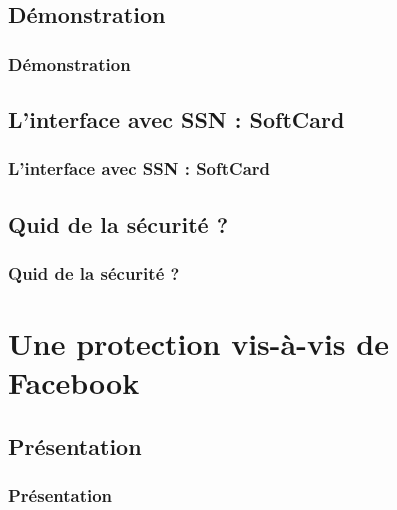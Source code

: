 \documentclass{beamer}
\begin{document}
\subsection{Démonstration}
\begin{frame}
    \frametitle{Démonstration}
    \begin{block}{}
    \end{block}
\end{frame}

\subsection{L'interface avec SSN : SoftCard}
\begin{frame}
    \frametitle{L'interface avec SSN : SoftCard}
    \begin{block}{}
    \end{block}
\end{frame}

\subsection{Quid de la sécurité ?}
\begin{frame}
    \frametitle{Quid de la sécurité ?}
    \begin{block}{}
    \end{block}
\end{frame}

\section{Une protection vis-à-vis de Facebook}

\subsection{Présentation}

\begin{frame}
    \frametitle{Présentation}
    \begin{block}{ }
    \end{block}
\end{frame}
\end{document}
